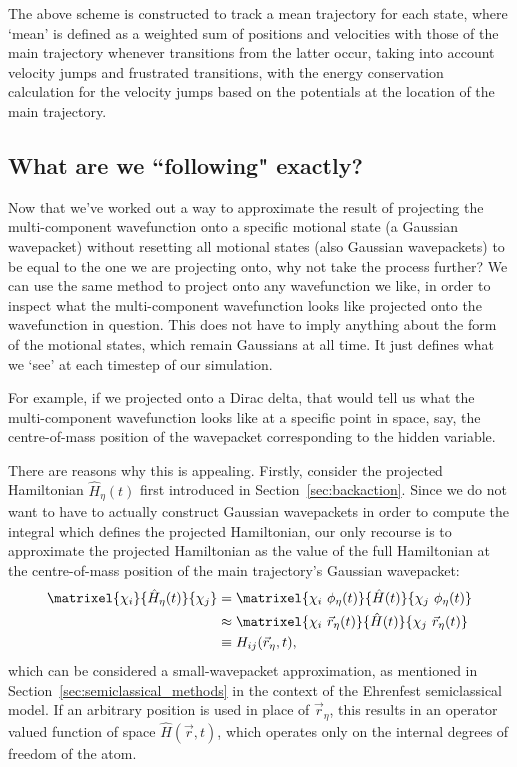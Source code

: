 The above scheme is constructed to track a mean trajectory for each state, where `mean' is defined as a weighted sum of positions and velocities with those of the main trajectory whenever transitions from the latter occur, taking into account velocity jumps and frustrated transitions, with the energy conservation calculation for the velocity jumps based on the potentials at the location of the main trajectory.

\subsection{What are we ``following" exactly?}\label{sec:dirac_deltas}

Now that we've worked out a way to approximate the result of projecting the multi-component wavefunction onto a specific motional state (a Gaussian wavepacket) without resetting all motional states (also Gaussian wavepackets) to be equal to the one we are projecting onto, why not take the process further? We can use the same method to project onto any wavefunction we like, in order to inspect what the multi-component wavefunction looks like projected onto the wavefunction in question. This does not have to imply anything about the form of the motional states, which remain Gaussians at all time. It just defines what we `see' at each timestep of our simulation.

For example, if we projected onto a Dirac delta, that would tell us what the multi-component wavefunction looks like at a specific point in space, say, the centre-of-mass position of the wavepacket corresponding to the hidden variable.

There are reasons why this is appealing. Firstly, consider the projected Hamiltonian $\hat H_\eta(t)$ first introduced in Section~\ref{sec:backaction}. Since we do not want to have to actually construct Gaussian wavepackets in order to compute the integral which defines the projected Hamiltonian, our only recourse is to approximate the projected Hamiltonian as the value of the full Hamiltonian at the centre-of-mass position of the main trajectory's Gaussian wavepacket:
\begin{align}
\matrixel{\chi_i}{\hat H_{\eta}(t)}{\chi_j} &= \matrixel{\chi_i\ \phi_\eta(t)}{\hat H(t)}{\chi_j\ \phi_\eta(t)}\\
&\approx \matrixel{\chi_i\ \vec r_\eta(t)}{\hat H(t)}{\chi_j\ \vec r_\eta(t)}\\
&\equiv H_{ij}(\vec r_\eta, t),
\end{align}
which can be considered a small-wavepacket approximation, as mentioned in Section~\ref{sec:semiclassical_methods} in the context of the Ehrenfest semiclassical model. If an arbitrary position is used in place of $\vec r_\eta$, this results in an operator valued function of space $\hat H(\vec r, t)$, which operates only on the internal degrees of freedom of the atom.

